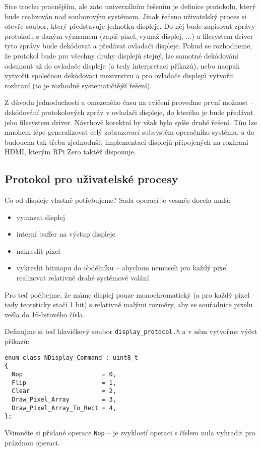 \documentclass{article}
\begin{document}
Sice trochu pracnějším, ale zato univerzálním řešením je definice protokolu, který bude realizován nad souborovým systémem. Jinak řečeno uživatelský proces si otevře soubor, který představuje jednotku displeje. Do něj bude zapisovat zprávy protokolu s daným významem (zapiš pixel, vymaž displej, ...) a filesystem driver tyto zprávy bude dekódovat a předávat ovladači displeje. Pokud se rozhodneme, že protokol bude pro všechny druhy displejů stejný, lze samotné dekódování odsunout až do ovladače displeje (a tedy interpretaci příkazů), nebo naopak vytvořit společnou dekódovací mezivrstvu a pro ovladače displejů vytvořit rozhraní (to je rozhodně systematičtější řešení).

Z důvodu jednoduchosti a omezeného času na cvičení proveďme první možnost -- dekódování protokolových zpráv v ovladači displeje, do kterého je bude předávat jeho filesystem driver. Návrhově korektní by však bylo spíše druhé řešení. Tím lze mnohem lépe generalizovat celý zobrazovací subsystém operačního systému, a do budoucna tak třeba zjednodušit implementaci  displejů připojených na rozhraní HDMI, kterým RPi Zero taktéž disponuje.

\subsection{Protokol pro uživatelské procesy}

Co od displeje vlastně potřebujeme? Sada operací je vesměs docela malá:
\begin{itemize}
	\item vymazat displej
	\item {} interní buffer na výstup displeje
	\item nakreslit pixel
	\item vykreslit bitmapu do obdélníku -- abychom nemuseli pro každý pixel realizovat relativně drahé systémové volání
\end{itemize}

Pro teď počítejme, že máme displej pouze monochromatický (a pro každý pixel tedy teoreticky stačí 1 bit) s relativně malými rozměry, aby se souřadnice pixelu vešla do 16-bitového čísla.

Definujme si teď hlavičkový soubor \texttt{display\_protocol.h} a v něm vytvořme výčet příkazů:
\begin{lstlisting}
enum class NDisplay_Command : uint8_t
{
  Nop                      = 0,
  Flip                     = 1,
  Clear                    = 2,
  Draw_Pixel_Array         = 3,
  Draw_Pixel_Array_To_Rect = 4,
};
\end{lstlisting}
Všimněte si přidané operace \texttt{Nop} -- je zvyklostí operaci s číslem nula vyhradit pro prázdnou operaci.
\end{document}

